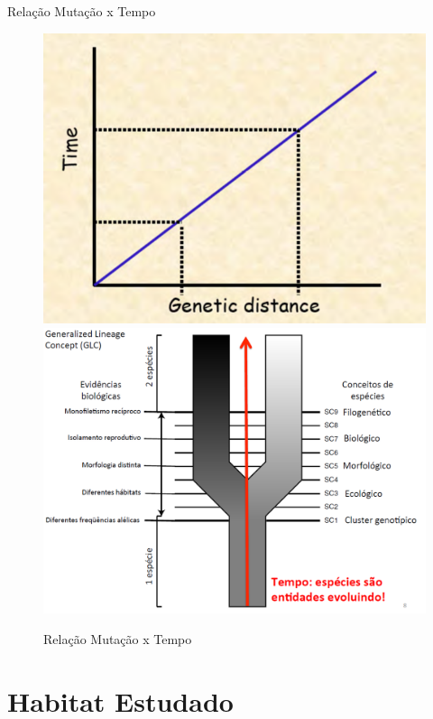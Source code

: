 \documentclass{beamer}
\begin{document}
\begin{frame}{Relação Mutação x Tempo}
    \begin{figure}[!h]
        \centering
        \includegraphics[scale=0.4]{timegen.png} \quad
	      \includegraphics[scale=0.3]{timegen2.png}
        \caption{Relação Mutação x Tempo}
        \label{Rotulo}
    \end{figure}
\end{frame}

\section{Habitat Estudado}
\end{document}
